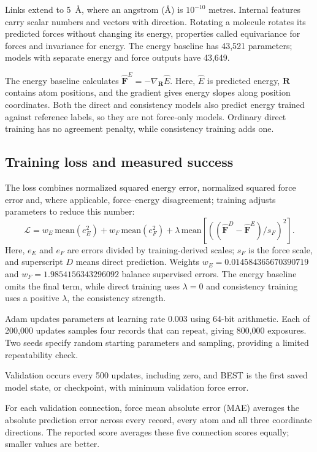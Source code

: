 \documentclass{article}
\begin{document}
Links extend to 5~\AA, where an angstrom (\AA) is $10^{-10}$ metres. Internal features carry scalar numbers and vectors with direction. Rotating a molecule rotates its predicted forces without changing its energy, properties called equivariance for forces and invariance for energy. The energy baseline has 43,521 parameters; models with separate energy and force outputs have 43,649.

The energy baseline calculates $\widehat{\mathbf F}^{E}=-\nabla_{\mathbf R}\widehat E$. Here, $\widehat E$ is predicted energy, $\mathbf R$ contains atom positions, and the gradient gives energy slopes along position coordinates. Both the direct and consistency models also predict energy trained against reference labels, so they are not force-only models. Ordinary direct training has no agreement penalty, while consistency training adds one.
\subsection{Training loss and measured success}
The loss combines normalized squared energy error, normalized squared force error and, where applicable, force--energy disagreement; training adjusts parameters to reduce this number:
\begin{equation}
\mathcal L=w_E\,\mathrm{mean}(e_E^2)+w_F\,\mathrm{mean}(e_F^2)
+\lambda\,\mathrm{mean}\!\left[\left((\widehat{\mathbf F}^{D}-\widehat{\mathbf F}^{E})/s_F\right)^2\right].
\end{equation}
Here, $e_E$ and $e_F$ are errors divided by training-derived scales; $s_F$ is the force scale, and superscript $D$ means direct prediction. Weights $w_E=0.014584365670390719$ and $w_F=1.9854156343296092$ balance supervised errors. The energy baseline omits the final term, while direct training uses $\lambda=0$ and consistency training uses a positive $\lambda$, the consistency strength.

Adam updates parameters at learning rate 0.003 using 64-bit arithmetic. Each of 200,000 updates samples four records that can repeat, giving 800,000 exposures. Two seeds specify random starting parameters and sampling, providing a limited repeatability check.

Validation occurs every 500 updates, including zero, and BEST is the first saved model state, or checkpoint, with minimum validation force error.

For each validation connection, force mean absolute error (MAE) averages the absolute prediction error across every record, every atom and all three coordinate directions. The reported score averages these five connection scores equally; smaller values are better.
\end{document}
